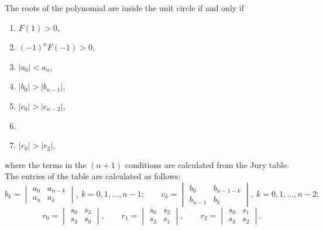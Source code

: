 \begin{center}
\tabJury
\end{center}

The roots of the polynomial are inside the unit circle if and only if
\begin{enumerate}
  \item $F(1)>0$,
  \item $(-1)^{n}F(-1)>0$,
  \item $|a_0|<a_n$,
  \item $|b_0|>|b_{n-1}|$,
  \item $|c_0|>|c_{n-2}|$,
  \item[\vdots]
  \item[$(n{+}1)$.] $|r_0|>|r_2|$,
\end{enumerate}
where the terms in the $(n+1)$ conditions are calculated from the Jury table. The entries of the table are
calculated as follows:
\[
  b_k=\begin{vmatrix}a_0&a_{n-k}\\a_n&a_k\end{vmatrix},\ k=0,1,\dots,n-1;\qquad
  c_k=\begin{vmatrix}b_0&b_{n-1-k}\\b_{n-1}&b_k\end{vmatrix},\ k=0,1,\dots,n-2;
\]
\[
  r_0=\begin{vmatrix}s_0&s_3\\s_3&s_0\end{vmatrix},\qquad
  r_1=\begin{vmatrix}s_0&s_2\\s_3&s_1\end{vmatrix},\qquad
  r_2=\begin{vmatrix}s_0&s_1\\s_3&s_2\end{vmatrix}.
\]


